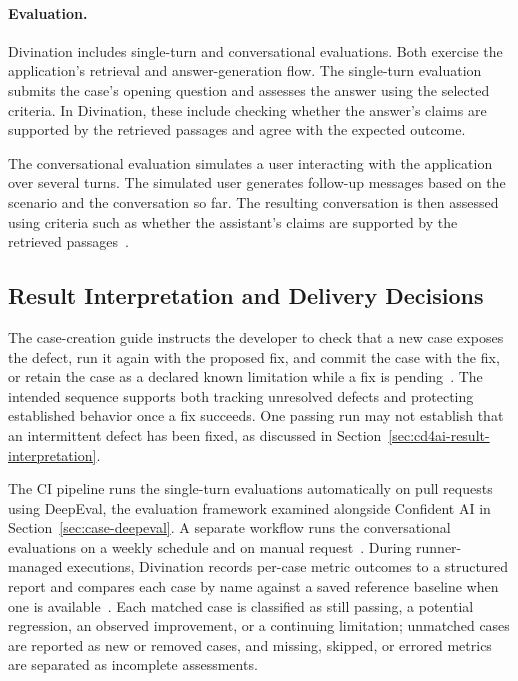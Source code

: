 \paragraph{Evaluation.}
Divination includes single-turn and conversational evaluations. Both exercise
the application's retrieval and answer-generation flow. The single-turn
evaluation submits the case's opening question and assesses the answer using
the selected criteria. In Divination, these include checking whether the
answer's claims are supported by the retrieved passages and agree with the
expected outcome.

The conversational evaluation simulates a user interacting with the application
over several turns. The simulated user generates follow-up messages based on
the scenario and the conversation so far. The resulting conversation is then
assessed using criteria such as whether the assistant's claims are supported
by the retrieved passages~\parencite{Divination:Evaluations}.

\subsection{Result Interpretation and Delivery Decisions}

The case-creation guide instructs the developer to check that a new case
exposes the defect, run it again with the proposed fix, and commit the case
with the fix, or retain the case as a declared known limitation while a fix is
pending~\parencite{Divination:Evaluations}. The intended sequence supports both
tracking unresolved defects and protecting established behavior once a fix
succeeds. One passing run may not
establish that an intermittent defect has been fixed, as discussed in
Section~\ref{sec:cd4ai-result-interpretation}.

The CI pipeline runs the single-turn evaluations automatically on pull requests
using DeepEval, the evaluation framework examined alongside Confident AI in
Section~\ref{sec:case-deepeval}. A separate workflow runs the conversational
evaluations on a weekly schedule and on manual
request~\parencite{Divination:CI}. During runner-managed executions, Divination
records per-case metric outcomes to a structured report and compares each case
by name against a saved reference baseline when one is
available~\parencite{Divination:CI,Divination:Evaluations}. Each matched case is
classified as still passing, a potential regression, an observed improvement,
or a continuing limitation; unmatched cases are reported as new or removed
cases, and missing, skipped, or errored metrics are separated as incomplete
assessments.

